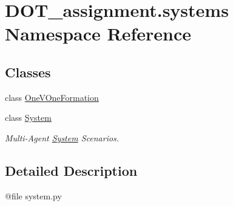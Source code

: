 \hypertarget{namespace_d_o_t__assignment_1_1systems}{}\section{D\+O\+T\+\_\+assignment.\+systems Namespace Reference}
\label{namespace_d_o_t__assignment_1_1systems}
\subsection*{Classes}
\begin{DoxyCompactItemize}
\item 
class \mbox{\hyperlink{class_d_o_t__assignment_1_1systems_1_1_one_v_one_formation}{One\+V\+One\+Formation}}
\item 
class \mbox{\hyperlink{class_d_o_t__assignment_1_1systems_1_1_system}{System}}
\begin{DoxyCompactList}\small\item\em Multi-\/\+Agent \mbox{\hyperlink{class_d_o_t__assignment_1_1systems_1_1_system}{System}} Scenarios. \end{DoxyCompactList}\end{DoxyCompactItemize}


\subsection{Detailed Description}
\begin{DoxyVerb}@file system.py
\end{DoxyVerb}
 